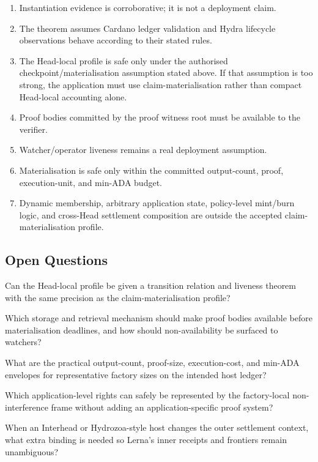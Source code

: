 \documentclass[a4paper,11pt]{article}
\theoremstyle{definition}
\theoremstyle{plain}
\theoremstyle{remark}
\begin{document}
\begin{enumerate}[leftmargin=1.2cm]
\item Instantiation evidence is corroborative; it is not a deployment claim.
\item The theorem assumes Cardano ledger validation and Hydra lifecycle
observations behave according to their stated rules.
\item The Head-local profile is safe only under the authorised
checkpoint/materialisation assumption stated above. If that assumption is too
strong, the application must use claim-materialisation rather than compact
Head-local accounting alone.
\item Proof bodies committed by the proof witness root must be available to the
verifier.
\item Watcher/operator liveness remains a real deployment assumption.
\item Materialisation is safe only within the committed output-count, proof,
execution-unit, and min-ADA budget.
\item Dynamic membership, arbitrary application state, policy-level mint/burn
logic, and cross-Head settlement composition are outside the accepted
claim-materialisation profile.
\end{enumerate}

\subsection{Open Questions}
\label{sec:open-questions}

\begin{description}[leftmargin=3.4cm,style=nextline]
\item[Head-local formalisation.]
Can the Head-local profile be given a transition relation and liveness theorem
with the same precision as the claim-materialisation profile?

\item[Proof availability.]
Which storage and retrieval mechanism should make proof bodies available before
materialisation deadlines, and how should non-availability be surfaced to
watchers?

\item[Capacity envelopes.]
What are the practical output-count, proof-size, execution-cost, and min-ADA
envelopes for representative factory sizes on the intended host ledger?

\item[Application semantics.]
Which application-level rights can safely be represented by the factory-local
non-interference frame without adding an application-specific proof system?

\item[Cross-Head composition.]
When an Interhead or Hydrozoa-style host changes the outer settlement context,
what extra binding is needed so Lerna's inner receipts and frontiers remain
unambiguous?
\end{description}
\end{document}
